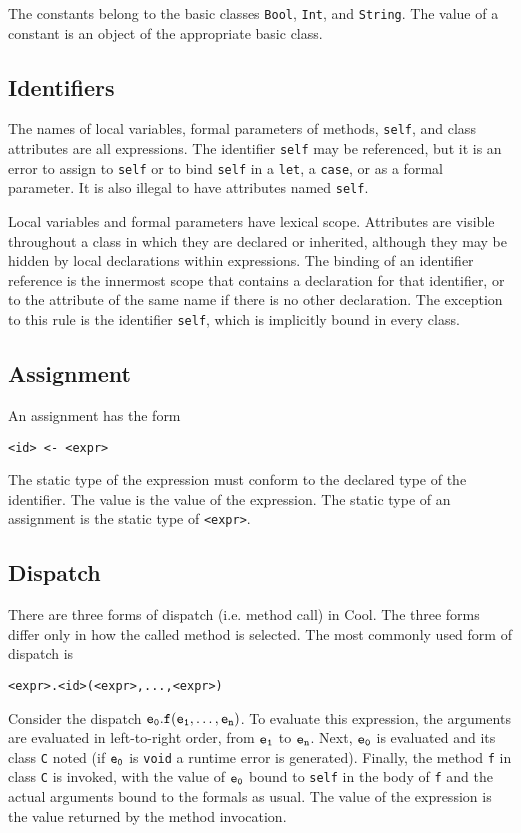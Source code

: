 \documentclass[11pt]{article}
\begin{document}
The constants belong to the basic classes {\tt Bool}, {\tt Int}, and
{\tt String}.
The value of a constant is an object of the appropriate basic class.

\subsection{Identifiers}

The names of local variables, formal parameters of methods,  {\tt self},
and class attributes are all expressions.  The identifier {\tt self} may
be referenced, but it is an error to assign to {\tt self} or to bind
{\tt self} in a {\tt let}, a {\tt case}, or as a formal parameter.
It is also illegal to have attributes named {\tt self}.

Local variables and formal parameters have lexical scope.  Attributes
are visible throughout a class in which they are declared or
inherited, although they may be hidden by local declarations within
expressions.  The binding of an identifier reference is the innermost
scope that contains a declaration for that identifier, or to the
attribute of the same name if there is no other declaration.  The
exception to this rule is the identifier {\tt self}, which is
implicitly bound in every class.

\subsection{Assignment}
An assignment has the form
\begin{verbatim}
<id> <- <expr> 
\end{verbatim}
The static type of the expression must conform to the declared type of
the identifier.  The value is the value of the expression.
The static type of an assignment is the static type of {\tt <expr>}.

\subsection{Dispatch}

There are three forms of dispatch (i.e. method call) in Cool. 
The three forms differ only in how the called method is selected.
The most commonly used form of dispatch is
\begin{verbatim}
<expr>.<id>(<expr>,...,<expr>)
\end{verbatim}
Consider the dispatch $\tt e_0.f(e_1,\ldots,e_n)$.
To evaluate this expression, the arguments are evaluated in left-to-right
order, from $\tt e_1$ to $\tt e_n$.  Next, $\tt e_0$ is evaluated and
its class {\tt C} noted (if $\tt e_0$ is {\tt void} a runtime error is
generated).  Finally, the method {\tt f} in class {\tt C}
is invoked, with the value of $\tt e_0$ bound to {\tt self} in the body of
{\tt f} and the actual arguments bound to the formals as usual.
The value of the expression is the value returned by the method invocation.
\end{document}
